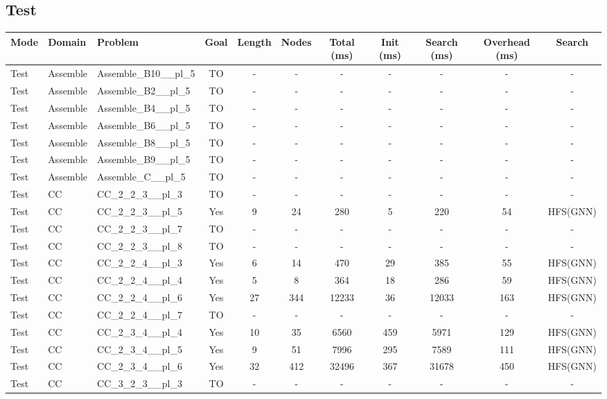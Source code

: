 \documentclass{article}
\begin{document}
\subsection*{Test}
\begin{tabular}{lllcccccccc}
\toprule
Mode & Domain & Problem & Goal & Length & Nodes & Total (ms) & Init (ms) & Search (ms) & Overhead (ms) & Search \\
\midrule
Test & Assemble & Assemble\_B10\_\_pl\_5 & TO & - & - & - & - & - & - & - \\
Test & Assemble & Assemble\_B2\_\_pl\_5 & TO & - & - & - & - & - & - & - \\
Test & Assemble & Assemble\_B4\_\_pl\_5 & TO & - & - & - & - & - & - & - \\
Test & Assemble & Assemble\_B6\_\_pl\_5 & TO & - & - & - & - & - & - & - \\
Test & Assemble & Assemble\_B8\_\_pl\_5 & TO & - & - & - & - & - & - & - \\
Test & Assemble & Assemble\_B9\_\_pl\_5 & TO & - & - & - & - & - & - & - \\
Test & Assemble & Assemble\_C\_\_pl\_5 & TO & - & - & - & - & - & - & - \\
Test & CC & CC\_2\_2\_3\_\_pl\_3 & TO & - & - & - & - & - & - & - \\
Test & CC & CC\_2\_2\_3\_\_pl\_5 & Yes & 9 & 24 & 280 & 5 & 220 & 54 & HFS(GNN) \\
Test & CC & CC\_2\_2\_3\_\_pl\_7 & TO & - & - & - & - & - & - & - \\
Test & CC & CC\_2\_2\_3\_\_pl\_8 & TO & - & - & - & - & - & - & - \\
Test & CC & CC\_2\_2\_4\_\_pl\_3 & Yes & 6 & 14 & 470 & 29 & 385 & 55 & HFS(GNN) \\
Test & CC & CC\_2\_2\_4\_\_pl\_4 & Yes & 5 & 8 & 364 & 18 & 286 & 59 & HFS(GNN) \\
Test & CC & CC\_2\_2\_4\_\_pl\_6 & Yes & 27 & 344 & 12233 & 36 & 12033 & 163 & HFS(GNN) \\
Test & CC & CC\_2\_2\_4\_\_pl\_7 & TO & - & - & - & - & - & - & - \\
Test & CC & CC\_2\_3\_4\_\_pl\_4 & Yes & 10 & 35 & 6560 & 459 & 5971 & 129 & HFS(GNN) \\
Test & CC & CC\_2\_3\_4\_\_pl\_5 & Yes & 9 & 51 & 7996 & 295 & 7589 & 111 & HFS(GNN) \\
Test & CC & CC\_2\_3\_4\_\_pl\_6 & Yes & 32 & 412 & 32496 & 367 & 31678 & 450 & HFS(GNN) \\
Test & CC & CC\_3\_2\_3\_\_pl\_3 & TO & - & - & - & - & - & - & - \\

\end{tabular}
\end{document}
